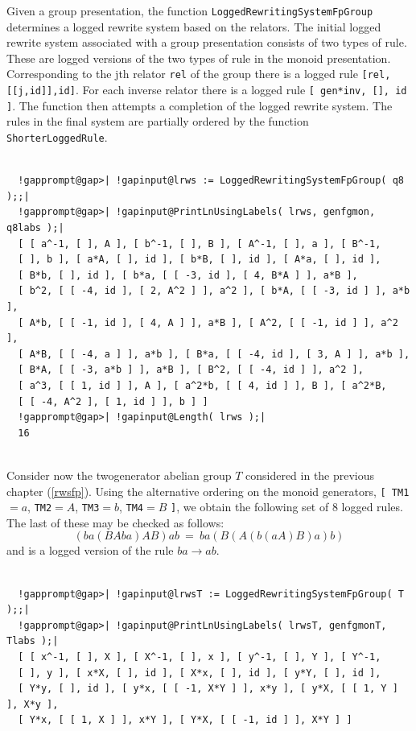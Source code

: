 \documentclass[a4paper,11pt]{report}
\begin{document}
{{{ Given a group presentation, the function \texttt{LoggedRewritingSystemFpGroup} determines a logged rewrite system based on the relators. The initial logged
rewrite system associated with a group presentation consists of two types of
rule. These are logged versions of the two types of rule in the monoid
presentation. Corresponding to the j\texttt{}th relator \texttt{rel} of the group there is a logged rule \texttt{[rel,[[j,id]],id]}. For each inverse relator there is a logged rule \texttt{[ gen*inv, [], id ]}. The function then attempts a completion of the logged rewrite system. The
rules in the final system are partially ordered by the function \texttt{ShorterLoggedRule}. 

 }

 
\begin{Verbatim}[commandchars=!@|,fontsize=\small,frame=single,label=Example]
  
  !gapprompt@gap>| !gapinput@lrws := LoggedRewritingSystemFpGroup( q8 );;|
  !gapprompt@gap>| !gapinput@PrintLnUsingLabels( lrws, genfgmon, q8labs );|
  [ [ a^-1, [ ], A ], [ b^-1, [ ], B ], [ A^-1, [ ], a ], [ B^-1, 
  [ ], b ], [ a*A, [ ], id ], [ b*B, [ ], id ], [ A*a, [ ], id ], 
  [ B*b, [ ], id ], [ b*a, [ [ -3, id ], [ 4, B*A ] ], a*B ], 
  [ b^2, [ [ -4, id ], [ 2, A^2 ] ], a^2 ], [ b*A, [ [ -3, id ] ], a*b ], 
  [ A*b, [ [ -1, id ], [ 4, A ] ], a*B ], [ A^2, [ [ -1, id ] ], a^2 ], 
  [ A*B, [ [ -4, a ] ], a*b ], [ B*a, [ [ -4, id ], [ 3, A ] ], a*b ], 
  [ B*A, [ [ -3, a*b ] ], a*B ], [ B^2, [ [ -4, id ] ], a^2 ], 
  [ a^3, [ [ 1, id ] ], A ], [ a^2*b, [ [ 4, id ] ], B ], [ a^2*B, 
  [ [ -4, A^2 ], [ 1, id ] ], b ] ]
  !gapprompt@gap>| !gapinput@Length( lrws );|
  16
  
\end{Verbatim}
 

 Consider now the two\texttt{}generator abelian group $T$ considered in the previous chapter (\ref{rwsfp}). Using the alternative ordering on the monoid generators, \texttt{[ T{\textunderscore}M1}$=a$, \texttt{T{\textunderscore}M2}$=A$, \texttt{T{\textunderscore}M3}$=b$, \texttt{T{\textunderscore}M4}$=B$ \texttt{]}, we obtain the following set of $8$ logged rules. The last of these may be checked as follows: 
\[ (ba(BAba)AB)ab ~=~ ba(B(A(b(aA)B)a)b) \]
 and is a logged version of the rule $ba \to ab$. 

 
\begin{Verbatim}[commandchars=!@|,fontsize=\small,frame=single,label=Example]
  
  !gapprompt@gap>| !gapinput@lrwsT := LoggedRewritingSystemFpGroup( T );;|
  !gapprompt@gap>| !gapinput@PrintLnUsingLabels( lrwsT, genfgmonT, Tlabs );|
  [ [ x^-1, [ ], X ], [ X^-1, [ ], x ], [ y^-1, [ ], Y ], [ Y^-1, 
  [ ], y ], [ x*X, [ ], id ], [ X*x, [ ], id ], [ y*Y, [ ], id ], 
  [ Y*y, [ ], id ], [ y*x, [ [ -1, X*Y ] ], x*y ], [ y*X, [ [ 1, Y ] ], X*y ], 
  [ Y*x, [ [ 1, X ] ], x*Y ], [ Y*X, [ [ -1, id ] ], X*Y ] ]
  

\end{Verbatim}}}
\end{document}
